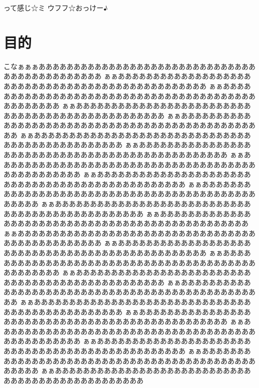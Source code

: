 って感じ☆ミ ウフフ☆おっけー♪


\section{目的}
こなぁぁぁあああああああああああああああああああああああああああああああああああああああああああああ
ぁぁああああああああああああああああああああああああああああああああああああああああああああああああ
ぁぁああああああああああああああああああああああああああああああああああああああああああああああああ
ぁぁああああああああああああああああああああああああああああああああああああああああああああああああ
ぁぁああああああああああああああああああああああああああああああああああああああああああああああああ
ぁぁああああああああああああああああああああああああああああああああああああああああああああああああ
ぁぁああああああああああああああああああああああああああああああああああああああああああああああああ
ぁぁああああああああああああああああああああああああああああああああああああああああああああああああ
ぁぁああああああああああああああああああああああああああああああああああああああああああああああああ
ぁぁああああああああああああああああああああああああああああああああああああああああああああああああ
ぁぁああああああああああああああああああああああああああああああああああああああああああああああああ
ぁぁああああああああああああああああああああああああああああああああああああああああああああああああ
ぁぁああああああああああああああああああああああああああああああああああああああああああああああああ
ぁぁああああああああああああああああああああああああああああああああああああああああああああああああ
ぁぁああああああああああああああああああああああああああああああああああああああああああああああああ
ぁぁああああああああああああああああああああああああああああああああああああああああああああああああ
ぁぁああああああああああああああああああああああああああああああああああああああああああああああああ
ぁぁああああああああああああああああああああああああああああああああああああああああああああああああ
ぁぁああああああああああああああああああああああああああああああああああああああああああああああああ
ぁぁああああああああああああああああああああああああああああああああああああああああああああああああ
ぁぁああああああああああああああああああああああああああああああああああああああああああああああああ
ぁぁああああああああああああああああああああああああああああああああああああああああああああああああ
ぁぁああああああああああああああああああああああああああああああああああああああああああああああああ
